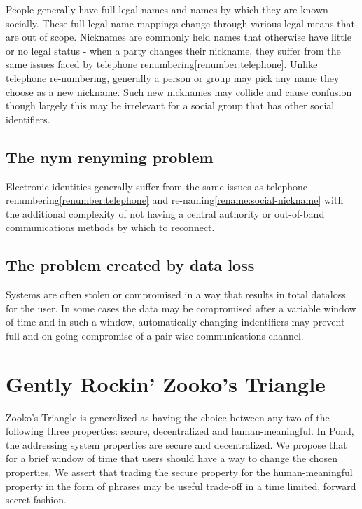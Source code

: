 \documentclass[letterpaper,twocolumn,10pt]{article}
\begin{document}
People generally have full legal names and names by which they are known
socially. These full legal name mappings change through various legal means
that are out of scope. Nicknames are commonly held names that otherwise have
little or no legal status - when a party changes their nickname, they suffer
from the same issues faced by telephone renumbering\ref{renumber:telephone}.
Unlike telephone re-numbering, generally a person or group may pick any name
they choose as a new nickname. Such new nicknames may collide and cause
confusion though largely this may be irrelevant for a social group that has
other social identifiers.

\subsection{The nym renyming problem}

Electronic identities generally suffer from the same issues as telephone
renumbering\ref{renumber:telephone} and re-naming\ref{rename:social-nickname}
with the additional complexity of not having a central authority or out-of-band
communications methods by which to reconnect.

\subsection{The problem created by data loss}
\label{sec:problem}

Systems are often stolen or compromised in a way that results in total
dataloss for the user. In some cases the data may be compromised after a
variable window of time and in such a window, automatically changing
indentifiers may prevent full and on-going compromise of a pair-wise
communications channel.

\section{Gently Rockin' Zooko's Triangle}

Zooko's Triangle\cite{zookostriangle} is generalized as
having the choice between any two of the following three properties: secure,
decentralized and human-meaningful. In Pond\cite{pond}, the addressing system
properties are secure and decentralized. We propose that for a brief window of
time that users should have a way to change the chosen properties.  We assert
that trading the secure property for the human-meaningful property in the form
of phrases may be useful trade-off in a time limited, forward secret fashion.
\end{document}
